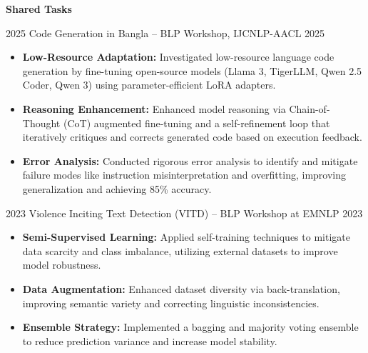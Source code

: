 
\vspace{.2em}
\hspace{.5em}
{\normalsize \textbf{Shared Tasks}}
\vspace{-0.5em}

\begin{researches}
\research
{2025} {Code Generation in Bangla – BLP Workshop, IJCNLP-AACL 2025}
{} {
\begin{itemize}
    \item \textbf{Low-Resource Adaptation:} Investigated low-resource language code generation by fine-tuning open-source models (Llama 3, TigerLLM, Qwen 2.5 Coder, Qwen 3) using parameter-efficient LoRA adapters.
    \item \textbf{Reasoning Enhancement:} Enhanced model reasoning via Chain-of-Thought (CoT) augmented fine-tuning and a self-refinement loop that iteratively critiques and corrects generated code based on execution feedback.
    \item \textbf{Error Analysis:} Conducted rigorous error analysis to identify and mitigate failure modes like instruction misinterpretation and overfitting, improving generalization and achieving 85\% accuracy.
\end{itemize}
} {}
\end{researches}


\vspace{-2em}
\begin{researches}
    \research
        {2023}   {Violence Inciting Text Detection (VITD) – BLP Workshop at EMNLP 2023}
        {} {
          \begin{itemize}
            \item \textbf{Semi-Supervised Learning:} Applied self-training techniques to mitigate data scarcity and class imbalance, utilizing external datasets to improve model robustness.
            \item \textbf{Data Augmentation:} Enhanced dataset diversity via back-translation, improving semantic variety and correcting linguistic inconsistencies.
            \item \textbf{Ensemble Strategy:} Implemented a bagging and majority voting ensemble to reduce prediction variance and increase model stability.
          \end{itemize}
        } {}
\end{researches}


\vspace{-1.5em}